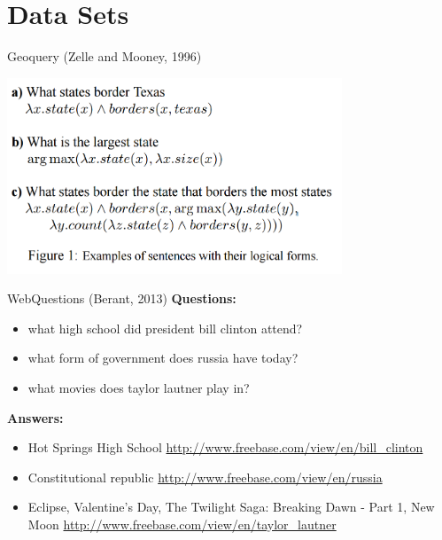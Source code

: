 \documentclass{beamer}
\begin{document}
\begin{frame}
  
\end{frame}

{

}


{

}


{

}

{

}

{

}


\section{Data Sets}

\begin{frame}{Geoquery (Zelle and Mooney, 1996)}
  \begin{center}
    \includegraphics[width=10cm]{geoquery}
  \end{center}
\end{frame}

\begin{frame}[fragile]{WebQuestions (Berant, 2013)} 
\textbf{Questions:}
\begin{itemize}
\item what high school did president bill clinton attend?
\item what form of government does russia have today?
\item what movies does taylor lautner play in?
\end{itemize}
\textbf{Answers:}
\begin{itemize}
\item Hot Springs High School \url{http://www.freebase.com/view/en/bill_clinton}
\item Constitutional republic \url{http://www.freebase.com/view/en/russia}
\item  Eclipse, Valentine's Day, The Twilight Saga: Breaking Dawn -   Part 1, New Moon \url{http://www.freebase.com/view/en/taylor_lautner}
\end{itemize}


\end{frame}
\end{document}
